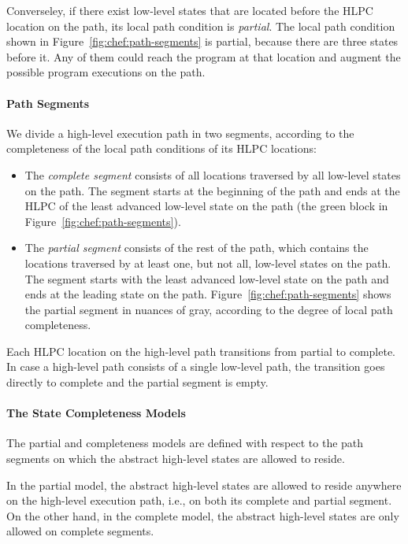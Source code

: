 Converseley, if there exist low-level states that are located before the HLPC location on the path, its local path condition is \emph{partial}.
%
The local path condition shown in Figure~\ref{fig:chef:path-segments} is partial, because there are three states before it.
%
Any of them could reach the program at that location and augment the possible program executions on the path.

\paragraph{Path Segments}

We divide a high-level execution path in two segments, according to the completeness of the local path conditions of its HLPC locations:
\begin{itemize}
\item The \emph{complete segment} consists of all locations traversed by all low-level states on the path.
%
The segment starts at the beginning of the path and ends at the HLPC of the least advanced low-level state on the path (the green block in Figure~\ref{fig:chef:path-segments}).
\item The \emph{partial segment} consists of the rest of the path, which contains the locations traversed by at least one, but not all, low-level states on the path.
%
The segment starts with the least advanced low-level state on the path and ends at the leading state on the path.  Figure~\ref{fig:chef:path-segments} shows the partial segment in nuances of gray, according to the degree of local path completeness.
\end{itemize}

Each HLPC location on the high-level path transitions from partial to complete.
%
In case a high-level path consists of a single low-level path, the transition goes directly to complete and the partial segment is empty.

\paragraph{The State Completeness Models}

The partial and completeness models are defined with respect to the path segments on which the abstract high-level states are allowed to reside.

In the partial model, the abstract high-level states are allowed to reside anywhere on the high-level execution path, i.e., on both its complete and partial segment.
%
On the other hand, in the complete model, the abstract high-level states are only allowed on complete segments.

